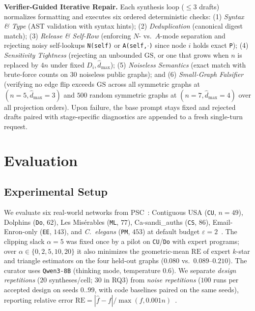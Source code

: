 \documentclass[conference]{IEEEtran}
\newlength{\ieeeindent}
\newcommand{\parhead}[1]{\par\noindent\hspace*{\ieeeindent}\textbf{#1}}
\theoremstyle{ieeeitalic}
\newcommand{\GS}{\mathrm{GS}}
\newcommand{\dhatmax}{\hat{d}_{\max}}
\newcommand{\RE}{\mathrm{RE}}
\begin{document}
\parhead{Verifier-Guided Iterative Repair.}
Each synthesis loop ($\le 3$ drafts) normalizes formatting and executes six ordered deterministic checks:
(1) \emph{Syntax \& Type} (AST validation with syntax hints);
(2) \emph{Deduplication} (canonical digest match);
(3) \emph{Release \& Self-Row} (enforcing $N$- vs.\ $A$-mode separation and rejecting noisy self-lookups \texttt{N(self)} or \texttt{A(self,$\cdot$)} since node $i$ holds exact \texttt{P});
(4) \emph{Sensitivity Tightness} (rejecting an unbounded $\GS$, or one that grows when $n$ is replaced by $4n$ under fixed $D_i, \dhatmax$);
(5) \emph{Noiseless Semantics} (exact match with brute-force counts on $30$ noiseless public graphs); and
(6) \emph{Small-Graph Falsifier} (verifying no edge flip exceeds $\GS$ across all symmetric graphs at $(n=5, \dhatmax=3)$ and $500$ random symmetric graphs at $(n=7, \dhatmax=4)$ over all projection orders).
Upon failure, the base prompt stays fixed and rejected drafts paired with stage-specific diagnostics are appended to a fresh single-turn request.

\section{Evaluation}
\label{sec:eval}

\subsection{Experimental Setup}
\label{sec:setup}

We evaluate six real-world networks from PSC~\cite{zhang2026psc}: Contiguous USA (\texttt{CU}, $n=49$), Dolphins (\texttt{Do}, $62$), Les Mis\'{e}rables (\texttt{ML}, $77$), Ca-sandi\_auths (\texttt{CS}, $86$), Email-Enron-only (\texttt{EE}, $143$), and \emph{C.~elegans} (\texttt{PM}, $453$) at default budget $\varepsilon=2$~\cite{he2025robust,zhang2026psc}. The clipping slack $\alpha=5$ was fixed once by a pilot on \texttt{CU}/\texttt{Do} with expert programs; over $\alpha \in \{0,2,5,10,20\}$ it also minimizes the geometric-mean $\RE$ of expert $k$-star and triangle estimators on the four held-out graphs ($0.080$ vs.\ $0.089$--$0.210$). The curator uses \texttt{Qwen3-8B} (thinking mode, temperature $0.6$). We separate \emph{design repetitions} ($20$ syntheses/cell; $30$ in RQ3) from \emph{noise repetitions} ($100$ runs per accepted design on seeds $0..99$, with code baselines paired on the same seeds), reporting relative error $\RE = |\hat{f} - f| / \max(f, 0.001n)$~\cite{imola2022communication,zhang2026psc}.
\end{document}
